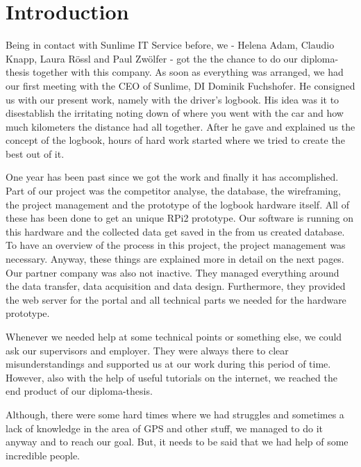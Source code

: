 \chapter*{Introduction}
Being in contact with Sunlime IT Service before, we - Helena Adam, Claudio Knapp, Laura Rössl and Paul Zwölfer - got the the chance to do our diploma-thesis together with this company. As soon as everything was arranged, we had our first meeting with the CEO of Sunlime, DI Dominik Fuchshofer. He consigned us with our present work, namely with the driver’s logbook. His idea was it to disestablish the irritating noting down of where you went with the car and how much kilometers the distance had all together. After he gave and explained us the concept of the logbook, hours of hard work started where we tried to create the best out of it.\newline


One year has been past since we got the work and finally it has accomplished. Part of our project was the competitor analyse, the database, the wireframing, the project management and the prototype of the logbook hardware itself. All of these has been done to get an unique RPi2 prototype. Our software is running on this hardware and the collected data get saved in the from us created database. To have an overview of the process in this project, the project management was necessary. Anyway, these things are explained more in detail on the next pages. Our partner company was also not inactive. They managed everything around the data transfer, data acquisition and data design. Furthermore, they provided the web server for the portal and all technical parts we needed for the hardware prototype.\newline


Whenever we needed help at some technical points or something else, we could ask our supervisors and employer. They were always there to clear misunderstandings and supported us at our work during this period of time. However, also with the help of useful tutorials on the internet, we reached the end product of our diploma-thesis.\newline


Although, there were some hard times where we had struggles and sometimes a lack of knowledge in the area of GPS and other stuff, we managed to do it anyway and to reach our goal. But, it needs to be said that we had help of some incredible people. \newline


